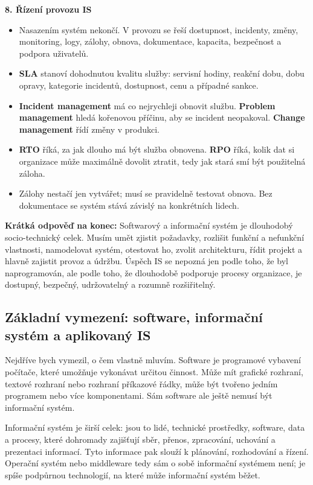 \documentclass[11pt,a4paper]{article}
\begin{document}
\textbf{8. Řízení provozu IS}
\begin{itemize}
  \item Nasazením systém nekončí. V provozu se řeší dostupnost, incidenty, změny, monitoring, logy, zálohy, obnova, dokumentace, kapacita, bezpečnost a podpora uživatelů.
  \item \textbf{SLA} stanoví dohodnutou kvalitu služby: servisní hodiny, reakční dobu, dobu opravy, kategorie incidentů, dostupnost, cenu a případné sankce.
  \item \textbf{Incident management} má co nejrychleji obnovit službu. \textbf{Problem management} hledá kořenovou příčinu, aby se incident neopakoval. \textbf{Change management} řídí změny v produkci.
  \item \textbf{RTO} říká, za jak dlouho má být služba obnovena. \textbf{RPO} říká, kolik dat si organizace může maximálně dovolit ztratit, tedy jak stará smí být použitelná záloha.
  \item Zálohy nestačí jen vytvářet; musí se pravidelně testovat obnova. Bez dokumentace se systém stává závislý na konkrétních lidech.
\end{itemize}

\textbf{Krátká odpověď na konec:} Softwarový a informační systém je dlouhodobý socio-technický celek. Musím umět zjistit požadavky, rozlišit funkční a nefunkční vlastnosti, namodelovat systém, otestovat ho, zvolit architekturu, řídit projekt a hlavně zajistit provoz a údržbu. Úspěch IS se nepozná jen podle toho, že byl naprogramován, ale podle toho, že dlouhodobě podporuje procesy organizace, je dostupný, bezpečný, udržovatelný a rozumně rozšiřitelný.

\subsection*{Základní vymezení: software, informační systém a aplikovaný IS}

Nejdříve bych vymezil, o čem vlastně mluvím. Software je programové vybavení počítače, které umožňuje vykonávat určitou činnost. Může mít grafické rozhraní, textové rozhraní nebo rozhraní příkazové řádky, může být tvořeno jedním programem nebo více komponentami. Sám software ale ještě nemusí být informační systém.

Informační systém je širší celek: jsou to lidé, technické prostředky, software, data a procesy, které dohromady zajišťují sběr, přenos, zpracování, uchování a prezentaci informací. Tyto informace pak slouží k plánování, rozhodování a řízení. Operační systém nebo middleware tedy sám o sobě informační systémem není; je spíše podpůrnou technologií, na které může informační systém běžet.
\end{document}
